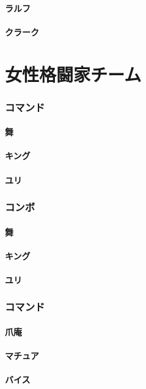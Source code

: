\documentclass[a4j,11pt]{jarticle}
\begin{document}
\subsection{ラルフ}
\newpage
\subsection{クラーク}
\newpage
\part{女性格闘家チーム}
\section{コマンド}
\subsection{舞}
\subsection{キング}
\subsection{ユリ}
\section{コンボ}
\subsection{舞}
\subsection{キング}
\subsection{ユリ}
\section{コマンド}
\subsection{爪庵}
\subsection{マチュア}
\subsection{バイス}
\end{document}

